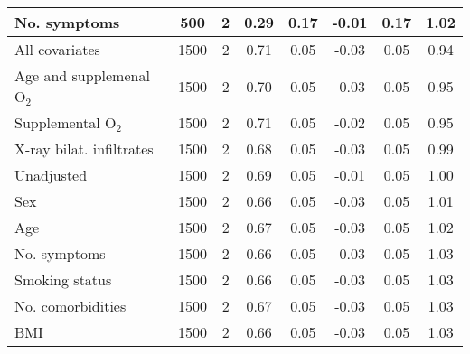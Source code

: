 \documentclass{article}
\begin{document}
\begin{table}
\begin{tabular}{lccccccc}
No. symptoms & 500 & 2 & 0.29 & 0.17 & -0.01 & 0.17 & 1.02\\ \midrule
All covariates & 1500 & 2 & 0.71 & 0.05 & -0.03 & 0.05 & 0.94\\
Age and supplemenal O$_{2}$ & 1500 & 2 & 0.70 & 0.05 & -0.03 & 0.05 & 0.95\\
Supplemental O$_{2}$ & 1500 & 2 & 0.71 & 0.05 & -0.02 & 0.05 & 0.95\\
X-ray bilat. infiltrates & 1500 & 2 & 0.68 & 0.05 & -0.03 & 0.05 & 0.99\\
Unadjusted & 1500 & 2 & 0.69 & 0.05 & -0.01 & 0.05 & 1.00\\
Sex & 1500 & 2 & 0.66 & 0.05 & -0.03 & 0.05 & 1.01\\
Age & 1500 & 2 & 0.67 & 0.05 & -0.03 & 0.05 & 1.02\\
No. symptoms & 1500 & 2 & 0.66 & 0.05 & -0.03 & 0.05 & 1.03\\
Smoking status & 1500 & 2 & 0.66 & 0.05 & -0.03 & 0.05 & 1.03\\
No. comorbidities & 1500 & 2 & 0.67 & 0.05 & -0.03 & 0.05 & 1.03\\
BMI & 1500 & 2 & 0.66 & 0.05 & -0.03 & 0.05 & 1.03\\ \bottomrule
\hline
\end{tabular}
\end{table}
 
\end{document}

